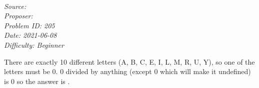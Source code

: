 \SSbreak\\
\emph{Source: \Cop}\\
\emph{Proposer: \Pada}\\ %
\emph{Problem ID: 205}\\
\emph{Date: 2021-06-08}\\
\emph{Difficulty: Beginner}\\
\SSbreak

\bigskip

\begin{solution}\hfil\medskip
  
    There are exactly 10 different letters (A, B, C, E, I, L, M, R, U, Y), so one of the letters must be 0. 0 divided by anything (except 0 which will make it undefined) is 0 so the answer is .
\end{solution}\bigskip
